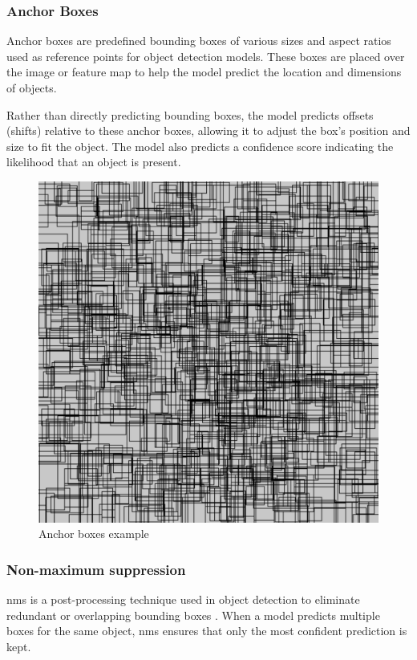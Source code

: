 \subsubsection*{Anchor Boxes}
Anchor boxes are predefined bounding boxes of various sizes and aspect ratios used as reference points for object detection models. These boxes are placed over the image or feature map to help the model predict the location and dimensions of objects.

Rather than directly predicting bounding boxes, the model predicts offsets (shifts) relative to these anchor boxes, allowing it to adjust the box's position and size to fit the object. The model also predicts a confidence score indicating the likelihood that an object is present. \cite{thinkautonomous:anchorboxes}


\begin{figure}[h!]
    \centering
    \includegraphics[width=0.75\linewidth]{figures/theory/image-recognition/anchor-boxes.png}
    \caption[Anchor boxes example]{Anchor boxes example \cite{thinkautonomous:anchorboxes}}
    \label{fig:anchor-box}
\end{figure}

\subsubsection*{Non-maximum suppression}
\gls{nms} is a post-processing technique used in object detection to eliminate redundant or overlapping bounding boxes . When a model predicts multiple boxes for the same object, \gls{nms} ensures that only the most confident prediction is kept. \\

